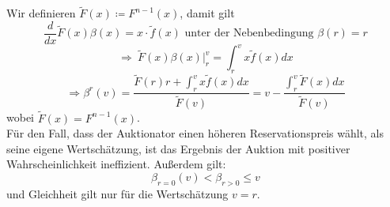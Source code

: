 \documentclass[12pt]{extreport} %
\theoremstyle{named}
\theoremstyle{itshape}
\theoremstyle{normal}
\begin{document}
Wir definieren $\tilde{F}(x) \coloneqq F^{n-1}(x)$, damit gilt
$$ \frac{d}{dx} \tilde{F}(x) \beta(x) = x \cdot \tilde{f}(x) \text{ unter der Nebenbedingung } \beta(r) = r $$
$$ \Rightarrow ~ \tilde{F}(x) \beta(x) \big|^{v}_{r} = \int_{r}^{v} x \tilde{f}(x) dx $$
$$ \Rightarrow \beta^{r}(v) = \frac{\tilde{F}(r)r + \int_{r}^{v} x \tilde{f}(x) dx}{\tilde{F}(v)} = v - \frac{\int_{r}^{v} \tilde{F}(x) dx}{\tilde{F}(v)} $$
wobei $\tilde{F}(x) = F^{n-1}(x)$. \\

Für den Fall, dass der Auktionator einen höheren Reservationspreis wählt, als seine eigene Wertschätzung, ist das Ergebnis der Auktion mit positiver Wahrscheinlichkeit ineffizient. Außerdem gilt:
$$ \beta_{r=0}(v) < \beta_{r > 0} \leq v $$
und Gleichheit gilt nur für die Wertschätzung $v = r$.
\end{document}

